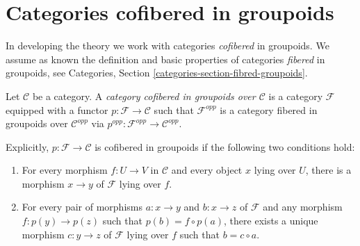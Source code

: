 \section{Categories cofibered in groupoids}
\label{section-preliminary}

\noindent
In developing the theory we work with categories {\it cofibered} in groupoids. 
 We assume as known the definition and basic properties of categories 
{\it fibered} in groupoids, see
Categories, Section \ref{categories-section-fibred-groupoids}.

\begin{definition}
\label{definition-category-cofibred-groupoids}
Let $\mathcal{C}$ be a category.  A {\it category cofibered in groupoids over 
$\mathcal{C}$} is a category $\mathcal{F}$ equipped with a functor
$p: \mathcal{F} \to \mathcal{C}$ such that $\mathcal{F}^{opp}$ is a category 
fibered in groupoids over $\mathcal{C}^{opp}$ via
$p^{opp}: \mathcal{F}^{opp} \to \mathcal{C}^{opp}$.
\end{definition}

\noindent
Explicitly, $p: \mathcal{F} \to \mathcal{C}$ is cofibered in groupoids if 
the following two conditions hold:
\begin{enumerate}
\item For every morphism $f: U \to V$ in $\mathcal{C}$ and every object 
$x$ lying over $U$, there is a morphism $x \to y$ of $\mathcal{F}$ lying 
over $f$.
\item For every pair of morphisms $a: x \to y$ and $b: x \to z$ 
of $\mathcal{F}$ and any morphism $f: p(y) \to p(z)$ such that $p(b) = f 
\circ p(a)$, there exists a unique morphism $c: y \to z$ of $\mathcal 
F$ lying over $f$ such that $b = c \circ a$.
\end{enumerate}

